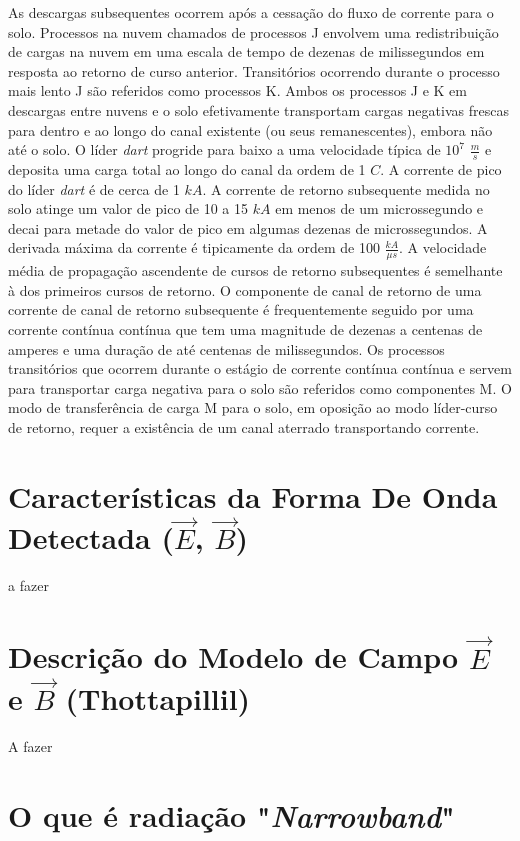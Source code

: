 \documentclass[a4paper, 12pt, onecolumn,singlespacing]{article}
\begin{document}
	As descargas subsequentes ocorrem após a cessação do fluxo de corrente para o solo. Processos na nuvem chamados de processos J envolvem uma redistribuição de cargas na nuvem em uma escala de tempo de dezenas de milissegundos em resposta ao retorno de curso anterior. Transitórios ocorrendo durante o processo mais lento J são referidos como processos K. Ambos os processos J e K em descargas entre nuvens e o solo efetivamente transportam cargas negativas frescas para dentro e ao longo do canal existente (ou seus remanescentes), embora não até o solo. O líder \textit{dart} progride para baixo a uma velocidade típica de $10^7$ $\frac{m}{s}$ e deposita uma carga total ao longo do canal da ordem de 1 $C$. A corrente de pico do líder \textit{dart} é de cerca de 1 $kA$. A corrente de retorno subsequente medida no solo atinge um valor de pico de 10 a 15 $kA$ em menos de um microssegundo e decai para metade do valor de pico em algumas dezenas de microssegundos. A derivada máxima da corrente é tipicamente da ordem de 100 $\frac{kA}{\mu s}$. A velocidade média de propagação ascendente de cursos de retorno subsequentes é semelhante à dos primeiros cursos de retorno. O componente de canal de retorno de uma corrente de canal de retorno subsequente é frequentemente seguido por uma corrente contínua contínua que tem uma magnitude de dezenas a centenas de amperes e uma duração de até centenas de milissegundos. Os processos transitórios que ocorrem durante o estágio de corrente contínua contínua e servem para transportar carga negativa para o solo são referidos como componentes M. O modo de transferência de carga M para o solo, em oposição ao modo líder-curso de retorno, requer a existência de um canal aterrado transportando corrente.
	
	\section{Características da Forma De Onda Detectada ($\vec{E}$, $\vec{B}$)}
	
	a fazer
	
	\section{Descrição do Modelo de Campo $\vec{E}$ e $\vec{B}$ (Thottapillil) }
	
	A fazer
	
	\section{O que é radiação "\textit{Narrowband}"}
	
\end{document}
